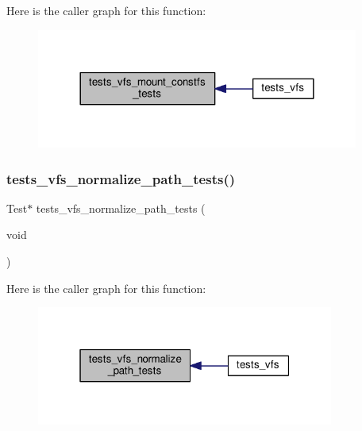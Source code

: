 Here is the caller graph for this function\+:
\nopagebreak
\begin{figure}[H]
\begin{center}
\leavevmode
\includegraphics[width=300pt]{tests-vfs_8c_a15914761731ece3546c1f4ae3b262c58_icgraph}
\end{center}
\end{figure}
\mbox{\label{tests-vfs_8c_abe821476b768ed80152215152e320355}} 
\subsubsection{\texorpdfstring{tests\+\_\+vfs\+\_\+normalize\+\_\+path\+\_\+tests()}{tests\_vfs\_normalize\_path\_tests()}}
{\footnotesize\ttfamily Test$\ast$ tests\+\_\+vfs\+\_\+normalize\+\_\+path\+\_\+tests (\begin{DoxyParamCaption}\item[{void}]{ }\end{DoxyParamCaption})}

Here is the caller graph for this function\+:
\nopagebreak
\begin{figure}[H]
\begin{center}
\leavevmode
\includegraphics[width=277pt]{tests-vfs_8c_abe821476b768ed80152215152e320355_icgraph}
\end{center}
\end{figure}
\mbox{\label{tests-vfs_8c_a5e6248f295aefb41b6a0888f647e8fd9}} 
